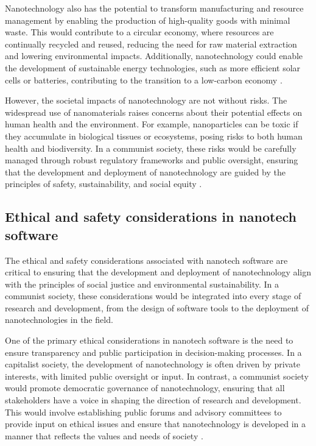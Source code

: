 Nanotechnology also has the potential to transform manufacturing and resource management by enabling the production of high-quality goods with minimal waste. This would contribute to a circular economy, where resources are continually recycled and reused, reducing the need for raw material extraction and lowering environmental impacts. Additionally, nanotechnology could enable the development of sustainable energy technologies, such as more efficient solar cells or batteries, contributing to the transition to a low-carbon economy \cite[pp.~315-322]{meyer2004nanotechnology}.

However, the societal impacts of nanotechnology are not without risks. The widespread use of nanomaterials raises concerns about their potential effects on human health and the environment. For example, nanoparticles can be toxic if they accumulate in biological tissues or ecosystems, posing risks to both human health and biodiversity. In a communist society, these risks would be carefully managed through robust regulatory frameworks and public oversight, ensuring that the development and deployment of nanotechnology are guided by the principles of safety, sustainability, and social equity \cite[pp.~335-342]{freitas1999nanomedicine}.

\subsection{Ethical and safety considerations in nanotech software}

The ethical and safety considerations associated with nanotech software are critical to ensuring that the development and deployment of nanotechnology align with the principles of social justice and environmental sustainability. In a communist society, these considerations would be integrated into every stage of research and development, from the design of software tools to the deployment of nanotechnologies in the field.

One of the primary ethical considerations in nanotech software is the need to ensure transparency and public participation in decision-making processes. In a capitalist society, the development of nanotechnology is often driven by private interests, with limited public oversight or input. In contrast, a communist society would promote democratic governance of nanotechnology, ensuring that all stakeholders have a voice in shaping the direction of research and development. This would involve establishing public forums and advisory committees to provide input on ethical issues and ensure that nanotechnology is developed in a manner that reflects the values and needs of society \cite[pp.~380-387]{ratner2003nanotechnology}.

